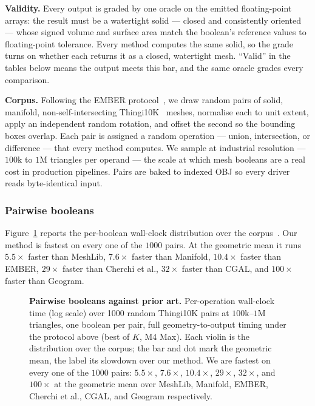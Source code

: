 \documentclass{egpubl}
\begin{document}
\textbf{Validity.} Every output is graded by one oracle on the emitted floating-point arrays: the result must be a watertight solid --- closed and consistently oriented --- whose signed volume and surface area match the boolean's reference values to floating-point tolerance. Every method computes the same solid, so the grade turns on whether each returns it as a closed, watertight mesh. ``Valid'' in the tables below means the output meets this bar, and the same oracle grades every comparison.

\textbf{Corpus.} Following the EMBER protocol~\cite{Trettner2022}, we draw random pairs of solid, manifold, non-self-intersecting Thingi10K~\cite{Thingi10K} meshes, normalise each to unit extent, apply an independent random rotation, and offset the second so the bounding boxes overlap. Each pair is assigned a random operation --- union, intersection, or difference --- that every method computes. We sample at industrial resolution --- $100\mathrm{k}$ to $1\mathrm{M}$ triangles per operand --- the scale at which mesh booleans are a real cost in production pipelines. Pairs are baked to indexed OBJ so every driver reads byte-identical input.

\subsubsection{Pairwise booleans}
\label{sec:results-pairwise}

Figure~\ref{fig:comparison-pairwise} reports the per-boolean wall-clock distribution over the corpus~\cite{trueform2025}. Our method is fastest on every one of the $1000$ pairs. At the geometric mean it runs $5.5\times$ faster than MeshLib, $7.6\times$ faster than Manifold, $10.4\times$ faster than EMBER, $29\times$ faster than Cherchi et al., $32\times$ faster than CGAL, and $100\times$ faster than Geogram.

\begin{figure}[t]
  \centering
  
  \caption{\textbf{Pairwise booleans against prior art.} Per-operation wall-clock time (log scale) over 1000 random Thingi10K pairs at $100\mathrm{k}$--$1\mathrm{M}$ triangles, one boolean per pair, full geometry-to-output timing under the protocol above (best of $K$, M4 Max). Each violin is the distribution over the corpus; the bar and dot mark the geometric mean, the label its slowdown over our method. We are fastest on every one of the $1000$ pairs: $5.5\times$, $7.6\times$, $10.4\times$, $29\times$, $32\times$, and $100\times$ at the geometric mean over MeshLib, Manifold, EMBER, Cherchi et al., CGAL, and Geogram respectively.}
  \label{fig:comparison-pairwise}
\end{figure}
\end{document}
